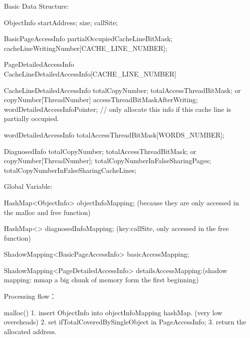 Basic Data Structure:

        ObjectInfo {
            startAddress;
            size;
            callSite;
        }

        BasicPageAccessInfo{
            partialOccupiedCacheLineBitMask;
            cacheLineWritingNumber[CACHE_LINE_NUMBER];
        }

        PageDetailedAccessInfo{
            CacheLineDetailedAccessInfo[CACHE_LINE_NUMBER]
        }

        CacheLineDetailedAccessInfo {
            totalCopyNumber;
            totalAccessThreadBitMask; or copyNumber[ThreadNumber]
            accessThreadBitMaskAfterWriting;
            wordDetailedAccessInfoPointer;   // only allocate this info if this cache line is partially occupied.
        }

        wordDetailedAccessInfo {
            totalAccessThreadBitMask[WORDS_NUMBER];
        }

        DiagnosedInfo {
            totalCopyNumber;
            totalAccessThreadBitMask; or copyNumber[ThreadNumber];
            totalCopyNumberInFalseSharingPages;
            totalCopyNumberInFalseSharingCacheLines;
        }


Global Variable:

        HashMap<ObjectInfo> objectInfoMapping; (because they are only accessed in the malloc and free function)

        HashMap<> diagnosedInfoMapping; (key:callSite, only accessed in the free function)

        ShadowMapping<BasicPageAccessInfo> basicAccessMapping;

        ShadowMapping<PageDetailedAccessInfo> detailsAccessMapping:(shadow mapping: mmap a big chunk of memory form the first beginning)


Processing flow：

        malloc(){
            1. insert ObjectInfo into objectInfoMapping hashMap.   (very low overeheads)
            2. set ifTotalCoveredBySingleObject in PageAccessInfo;
            3. return the allocated address.
        }

